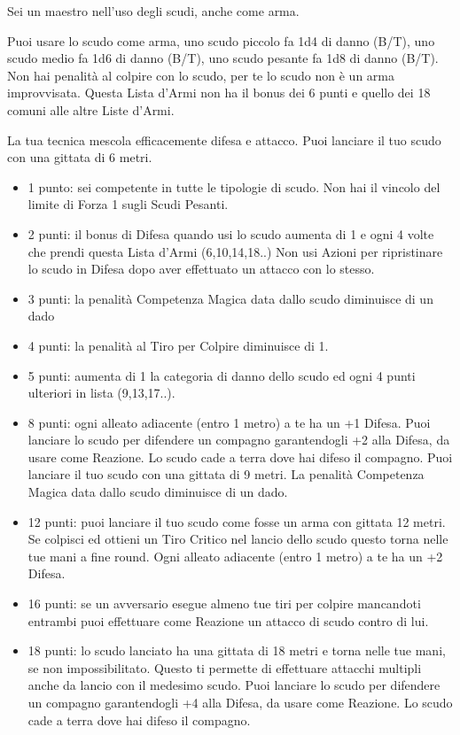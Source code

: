 \begin{multicols}{2}
Sei un maestro nell'uso degli scudi, anche come arma.

Puoi usare lo scudo come arma, uno scudo piccolo fa 1d4 di danno (B/T), uno scudo medio fa 1d6 di danno (B/T), uno scudo pesante fa 1d8 di danno (B/T).
Non hai penalità al colpire con lo scudo, per te lo scudo non è un arma improvvisata. Questa Lista d'Armi non ha il bonus dei 6 punti e quello dei 18 comuni alle altre Liste d'Armi.

La tua tecnica mescola efficacemente difesa e attacco. Puoi lanciare il tuo scudo con una gittata di 6 metri.

\begin{itemize}[leftmargin=*] \setlength{\itemsep}{0pt}
\item 1 punto: sei competente in tutte le tipologie di scudo. Non hai il vincolo del limite di Forza 1 sugli Scudi Pesanti.
\item 2 punti: il bonus di Difesa quando usi lo scudo aumenta di 1 e ogni 4 volte che prendi questa Lista d'Armi (6,10,14,18..) Non usi Azioni per ripristinare lo scudo in Difesa dopo aver effettuato un attacco con lo stesso.
\item 3 punti: la penalità Competenza Magica data dallo scudo diminuisce di un dado
\item 4 punti: la penalità al Tiro per Colpire diminuisce di 1.
\item 5 punti: aumenta di 1 la categoria di danno dello scudo ed ogni 4 punti ulteriori in lista (9,13,17..).
\item 8 punti: ogni alleato adiacente (entro 1 metro) a te ha un +1 Difesa. Puoi lanciare lo scudo per difendere un compagno garantendogli +2 alla Difesa, da usare come Reazione. Lo scudo cade a terra dove hai difeso il compagno. Puoi lanciare il tuo scudo con una gittata di 9 metri. La penalità Competenza Magica data dallo scudo diminuisce di un dado.
\item 12 punti: puoi lanciare il tuo scudo come fosse un arma con gittata 12 metri. Se colpisci ed ottieni un Tiro Critico nel lancio dello scudo questo torna nelle tue mani a fine round. Ogni alleato adiacente (entro 1 metro) a te ha un +2 Difesa.
\item 16 punti: se un avversario esegue almeno tue tiri per colpire mancandoti entrambi puoi effettuare come Reazione un attacco di scudo contro di lui.
\item 18 punti: lo scudo lanciato ha una gittata di 18 metri e torna nelle tue mani, se non impossibilitato. Questo ti permette di effettuare attacchi multipli anche da lancio con il medesimo scudo. Puoi lanciare lo scudo per difendere un compagno garantendogli +4 alla Difesa, da usare come Reazione. Lo scudo cade a terra dove hai difeso il compagno.


\end{itemize}
\end{multicols}
